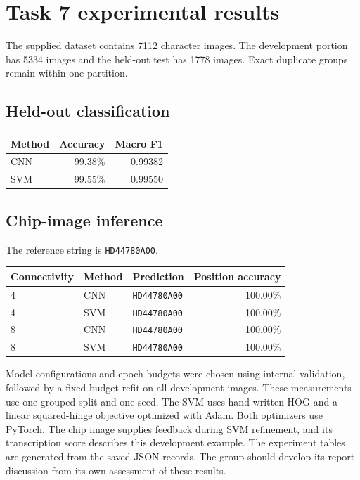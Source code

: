 \section{Task 7 experimental results}
The supplied dataset contains 7112 character images. The development portion has 5334 images and the held-out test has 1778 images. Exact duplicate groups remain within one partition.
\subsection{Held-out classification}
\begin{center}\begin{tabular}{lrr}\toprule
Method & Accuracy & Macro F1 \\\midrule
CNN & 99.38\% & 0.99382 \\
SVM & 99.55\% & 0.99550 \\
\bottomrule\end{tabular}\end{center}
\subsection{Chip-image inference}
The reference string is \texttt{HD44780A00}.
\begin{center}\begin{tabular}{lllr}\toprule
Connectivity & Method & Prediction & Position accuracy \\\midrule
4 & CNN & \texttt{HD44780A00} & 100.00\% \\
4 & SVM & \texttt{HD44780A00} & 100.00\% \\
8 & CNN & \texttt{HD44780A00} & 100.00\% \\
8 & SVM & \texttt{HD44780A00} & 100.00\% \\
\bottomrule\end{tabular}\end{center}
Model configurations and epoch budgets were chosen using internal validation, followed by a fixed-budget refit on all development images. These measurements use one grouped split and one seed. The SVM uses hand-written HOG and a linear squared-hinge objective optimized with Adam. Both optimizers use PyTorch. The chip image supplies feedback during SVM refinement, and its transcription score describes this development example.
The experiment tables are generated from the saved JSON records. The group should develop its report discussion from its own assessment of these results.
